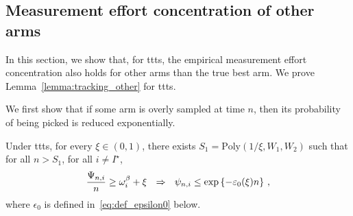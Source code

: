 \subsection{Measurement effort concentration of other arms}\label{app:confidence_ttts.other_arms}

In this section, we show that, for \gls{ttts}, the empirical measurement effort concentration also holds for other arms than the true best arm. We prove Lemma~\ref{lemma:tracking_other} for \gls{ttts}.

We first show that if some arm is overly sampled at time $n$, then its probability of being picked is reduced exponentially.

\begin{lemma}\label{lemma:over_allocation_finite_ttts}
\begin{leftbar}[lemmabar]
    Under \gls{ttts}, for every $\xi \in (0,1)$, there exists $S_1 = \text{Poly}(1/\xi,W_1,W_2)$ such that for all $n > S_1$, for all $i\neq I^\star$, 
    \[
        \frac{\Psi_{n,i}}{n} \geq \omega_{i}^\beta + \xi  \ \ \Rightarrow \ \ \psi_{n,i} \leq \exp\left\{-\varepsilon_0(\xi) n\right\}\,,
    \]
    where $\epsilon_0$ is defined in~\eqref{eq:def_epsilon0} below.
\end{leftbar}
\end{lemma}

